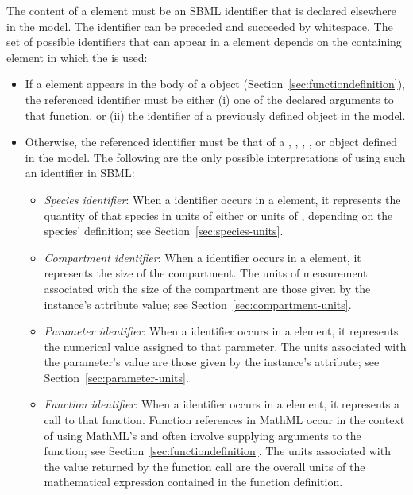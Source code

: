 The content of a  element must be an SBML identifier
that is declared elsewhere in the model.  The identifier can be
preceded and succeeded by whitespace. The set of possible
identifiers that can appear in a  element depends on the
containing element in which the  is used:
\begin{itemize}
  
\item If a  element appears in the body of a
  \FunctionDefinition object
  (Section~\ref{sec:functiondefinition}), the referenced
  identifier must be either (i) one of the declared arguments to
  that function, or (ii) the identifier of a previously defined
  \FunctionDefinition object in the model.
  
\item Otherwise, the referenced identifier must be that of a
  \Species, \Compartment, \Parameter, \FunctionDefinition, or
  \Reaction object defined in the model.  The following are the
  only possible interpretations of using such an identifier in
  SBML:
  \begin{itemize}
    
  \item \emph{Species identifier}: When a \Species identifier
    occurs in a  element, it represents the quantity of
    that species in units of either  or units of , depending
      on the species' definition; see
    Section~\ref{sec:species-units}.
    
  \item \emph{Compartment identifier}: When a \Compartment
    identifier occurs in a  element, it represents the
    size of the compartment.  The units of measurement
      associated with the size of the compartment are those given
      by the \Compartment instance's  attribute
      value; see Section~\ref{sec:compartment-units}.
    
  \item \emph{Parameter identifier}: When a \Parameter identifier
    occurs in a  element, it represents the numerical
    value assigned to that parameter.  The units
      associated with the parameter's value are those given by the
      \Parameter instance's  attribute; see
    Section~\ref{sec:parameter-units}.
    
  \item \emph{Function identifier}: When a \FunctionDefinition
    identifier occurs in a  element, it represents a
    call to that function.  Function references in MathML occur in
    the context of using MathML's  and often involve
    supplying arguments to the function; see
    Section~\ref{sec:functiondefinition}.  The units
      associated with the value returned by the function
      call are the overall units of the mathematical expression
    contained in the function definition.
    

\end{itemize}
\end{itemize}
